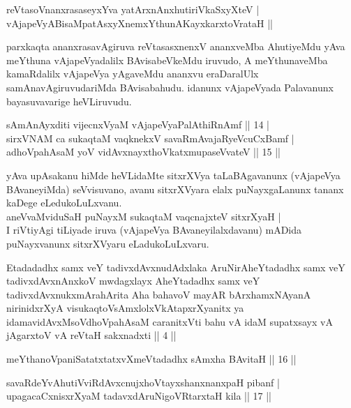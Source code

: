 \begin{shl}
reVtasoV\s nanxrasaseyxYva yatArxnAnxhutiriVkaSxyXteV | \\
vAjapeVyABisaMpatAsxyXnemxYthunAKayxkarxtoVrataH || 
\end{shl}

\begin{artha}
parxkaqta ananxrasavAgiruva reVtasasxnenxV ananxveMba AhutiyeMdu yAva meYthuna vAjapeVyadalilx BAvisabeVkeMdu iruvudo, A meYthunaveMba kamaRdalilx vAjapeVya yAgaveMdu ananxvu eraDaralUlx samAnavAgiruvudariMda BAvisabahudu. idanunx vAjapeVyada Palavanunx bayasuvavarige heVLiruvudu.
\end{artha}


\begin{shl}
sAmAnAyxditi vijecnxVyaM vAjapeVyaPalAthiRnAmf \hfill|| 14 | \\
sirxVNAM ca sukaqtaM vaqknekxV savaRmAvajaRyeVcuCxBamf | \\
adhoVpahAsaM yoV vidAvxnayxthoVkatxmupaseVvateV \hfill|| 15 || 
\end{shl}

\begin{artha}
yAva upAsakanu hiMde heVLidaMte sitxrXVya taLaBAgavanunx (vAjapeVya 
BAvaneyiMda) seVvisuvano, avanu sitxrXVyara elalx puNayxgaLanunx 
tananx kaDege eLedukoLuLxvanu. \\ aneVvaMviduSaH puNayxM sukaqtaM vaqcnajxteV sitxrXyaH | \\ I riVtiyAgi tiLiyade iruva 
(vAjapeVya BAvaneyilalxdavanu) mADida puNayxvanunx sitxrXVyaru eLadukoLuLxvaru.
\end{artha}

\begin{shl}
Etadadadhx samx veY tadivxdAvxnudAdxlaka AruNirAheYtadadhx samx veY tadivxdAvxnAnxkoV mwdagxlayx AheYtadadhx samx veY tadivxdAvxnukxmArahArita Aha bahavoV mayAR bArxhamxNAyanA nirinidxrXyA visukaqtoV\s sAmxlolxVkAtapxrXyanitx ya idamavidAvxMsoV\s dhoVpahAsaM caranitxVti bahu vA idaM supatxsayx vA jAgarxtoV vA reVtaH sakxnadxti || 4 ||
\end{shl}

\begin{shl}
meYthanoVpaniSatatxtatxvXmeVtadadhx sAmx\s \s ha BAvitaH \hfill|| 16 || 
\end{shl}

\begin{shl}
savaRdeYvA\s \s hutiVviRdAvxcnujxhoVtayxshanxnanxpaH pibanf | \\
upagacaCxnisxrXyaM tadavxdAruNigoVRtarxtaH kila \hfill|| 17 || 
\end{shl}

